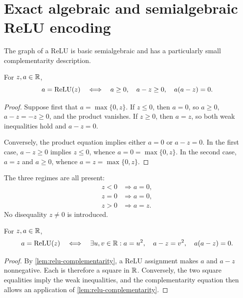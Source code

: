 \section{Exact algebraic and semialgebraic ReLU encoding}
\label{sec:relu}

The graph of a ReLU is basic semialgebraic and has a particularly small
complementarity description.

\begin{lemma}
\label{lem:relu-complementarity}
For \(z,a\in\mathbb{R}\),
\begin{equation}
  a=\operatorname{ReLU}(z)
  \quad\Longleftrightarrow\quad
  a\ge0,\quad a-z\ge0,\quad a(a-z)=0.
  \label{eq:relu-complementarity}
\end{equation}
\end{lemma}

\begin{proof}
Suppose first that \(a=\max\{0,z\}\).  If \(z\le0\), then \(a=0\), so
\(a\ge0\), \(a-z=-z\ge0\), and the product vanishes.  If \(z\ge0\), then
\(a=z\), so both weak inequalities hold and \(a-z=0\).

Conversely, the product equation implies either \(a=0\) or \(a-z=0\).  In the
first case, \(a-z\ge0\) implies \(z\le0\), whence
\(a=0=\max\{0,z\}\).  In the second case, \(a=z\) and \(a\ge0\), whence
\(a=z=\max\{0,z\}\).
\end{proof}

The three regimes are all present:
\begin{align}
  z<0 &\Longrightarrow a=0,\\
  z=0 &\Longrightarrow a=0,\\
  z>0 &\Longrightarrow a=z.
\end{align}
No disequality \(z\ne0\) is introduced.

\begin{lemma}
\label{lem:relu-polynomialization}
For \(z,a\in\mathbb{R}\),
\begin{equation}
 a=\operatorname{ReLU}(z)
 \quad\Longleftrightarrow\quad
 \exists u,v\in\mathbb{R}:
 a=u^2,\quad a-z=v^2,\quad a(a-z)=0.
 \label{eq:relu-polynomialization}
\end{equation}
\end{lemma}

\begin{proof}
By \cref{lem:relu-complementarity}, a ReLU assignment makes \(a\) and \(a-z\)
nonnegative.  Each is therefore a square in \(\mathbb{R}\).  Conversely, the two square
equalities imply the weak inequalities, and the complementarity equation then
allows an application of \cref{lem:relu-complementarity}.
\end{proof}

